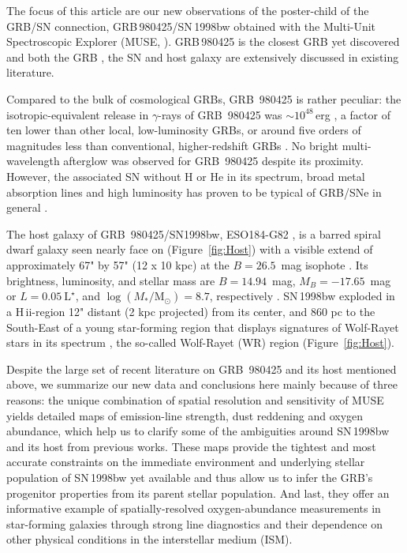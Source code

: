 \documentclass[traditabstract]{aa}
\newcommand{\hii}{\mbox{H\,{\sc ii}}}
\begin{document}
The focus of this article are our new observations of the poster-child of the GRB/SN connection, GRB\,980425/SN\,1998bw obtained with the Multi-Unit Spectroscopic Explorer (MUSE, \citealp{2010SPIE.7735E..08B}). GRB\,980425 is the closest GRB yet discovered and both the GRB \citep[e.g.][]{1998Natur.395..670G, 1998Natur.395..663K}, the SN \citep[e.g.][]{1998Natur.395..672I, 2001ApJ...555..900P, 2006ApJ...640..854M} and host galaxy \citep[e.g.][]{2000ApJ...542L..89F, 2005NewA...11..103S, 2006A&A...454..103H, 2009ApJ...693..347M, 2014A&A...562A..70M, 2016arXiv160901742M} are extensively discussed in existing literature. 

Compared to the bulk of cosmological GRBs, GRB~980425 is rather peculiar: the isotropic-equivalent release in $\gamma$-rays of GRB~980425 was $\sim10^{48}$\,erg \citep{1998Natur.395..670G}, a factor of ten lower than other local, low-luminosity GRBs, or around five orders of magnitudes less than conventional, higher-redshift GRBs \citep{2013ApJ...776...98X}. No bright multi-wavelength afterglow was observed for GRB~980425 despite its proximity. However, the associated SN without H or He in its spectrum, broad metal absorption lines and high luminosity has proven to be typical of GRB/SNe in general \citep{2012grbu.book..169H}.

The host galaxy of GRB~980425/SN1998bw, ESO184-G82 \citep{1989spce.book.....L}, is a barred spiral dwarf galaxy \citep{2000ApJ...542L..89F} seen nearly face on (Figure~\ref{fig:Host}) with a visible extend of approximately 67" by 57" (12 x 10 kpc) at the $B=26.5$~mag isophote \citep{2005NewA...11..103S}. Its brightness, luminosity, and stellar mass are $B=14.94$~mag, $M_B=-17.65$~mag or $L=0.05~\mathrm{L}^{\star}$, and $\log (M_{*}/\mathrm{M}_{\odot})= 8.7 $, respectively \citep{2005NewA...11..103S, 2014A&A...562A..70M}. SN\,1998bw exploded in a \hii-region 12" distant (2 kpc projected) from its center, and 860 pc to the South-East of a young star-forming region that displays signatures of Wolf-Rayet stars in its spectrum \citep{2006A&A...454..103H}, the so-called Wolf-Rayet (WR) region (Figure~\ref{fig:Host}).

Despite the large set of recent literature on GRB~980425 and its host mentioned above, we summarize our new data and conclusions here mainly because of three reasons: the unique combination of spatial resolution and sensitivity of MUSE yields detailed maps of emission-line strength, dust reddening and oxygen abundance, which help us to clarify some of the ambiguities around SN\,1998bw and its host from previous works. These maps provide the tightest and most accurate constraints on the immediate environment and underlying stellar population of SN\,1998bw yet available and thus allow us to infer the GRB's progenitor properties from its parent stellar population. And last, they offer an informative example of spatially-resolved oxygen-abundance measurements in star-forming galaxies through strong line diagnostics and their dependence on other physical conditions in the interstellar medium (ISM).
\end{document}
